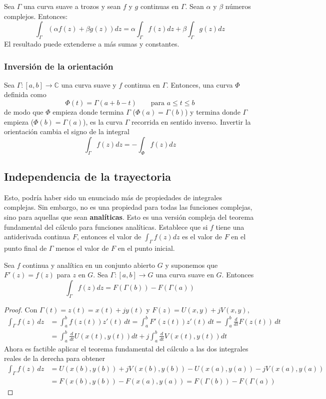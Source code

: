 Sea $\Gamma$ una curva suave a trozos y sean $f$ y $g$ continuas en $\Gamma$. Sean $\alpha$ y $\beta$ números complejos. Entonces:
$$
\int_\Gamma (\alpha f(z)+\beta g(z))dz = \alpha \int_\Gamma f(z) dz + \beta \int_\Gamma g(z)dz
$$
El resultado puede extenderse a más sumas y constantes.

\subsubsection{Inversión de la orientación}

Sea $\Gamma:[a,b]\to\mathbb{C}$ una curva suave y $f$ continua en $\Gamma$. Entonces, una curva $\varPhi$ definida como
$$
\varPhi(t)=\Gamma(a+b-t) \qquad \text{para } a\leqslant t \leqslant b
$$
de modo que $\varPhi$ empieza donde termina $\Gamma$ ($\varPhi(a)=\Gamma(b)$) y termina donde $\Gamma$ empieza ($\varPhi(b)=\Gamma(a)$), es la curva $\Gamma$ recorrida en sentido inverso. Invertir la orientación cambia el signo de la integral
$$
\int_\Gamma f(z)dz=-\int_\varPhi f(z)dz
$$

\subsection{Independencia de la trayectoria}

Esto, podría haber sido un enunciado más de propiedades de integrales complejas. Sin embargo, no es una propiedad para todas las funciones complejas, sino para aquellas que sean \textbf{analíticas}. Esto es una versión compleja del teorema fundamental del cálculo para funciones analíticas. Establece que si $f$ tiene una antiderivada continua $F$, entonces el valor de $\int_\Gamma f(z)dz$ es el valor de $F$ en el punto final de $\Gamma$ menos el valor de $F$ en el punto inicial.

\begin{theorem}\label{teo:independencia_de_la_trayectoria}
  Sea $f$ continua y analítica en un conjunto abierto $G$ y suponemos que $F'(z)=f(z)$ para $z$ en $G$. Sea $\Gamma:[a,b]\to G$ una curva suave en $G$. Entonces
  $$
  \int_\Gamma f(z)dz = F(\Gamma(b))-F(\Gamma(a))
  $$
\end{theorem}

\begin{proof}
  Con $\Gamma(t)=z(t)=x(t)+jy(t)$ y $F(z)=U(x,y)+jV(x,y)$,
  \begin{align*}
    \int_\Gamma f(z)\,dz &= \int_a^b f(z(t))z'(t)\,dt = \int_a^b F'(z(t))z'(t)\,dt = \int_a^b \frac{d}{dt}F(z(t))\,dt \\
                         &= \int_a^b \frac{d}{dt} U(x(t),y(t))dt + j\int_a^b \frac{d}{dt}V(x(t),y(t))dt
  \end{align*}
  Ahora es factible aplicar el teorema fundamental del cálculo a las dos integrales reales de la derecha para obtener
  \begin{align*}
    \int_\Gamma f(z)\,dz &= U(x(b),y(b))+jV(x(b),y(b))-U(x(a),y(a))-jV(x(a),y(a)) \\ 
                         &= F(x(b),y(b))-F(x(a),y(a)) = \boxed{F(\Gamma(b))-F(\Gamma(a))}
  \end{align*}
\end{proof}

